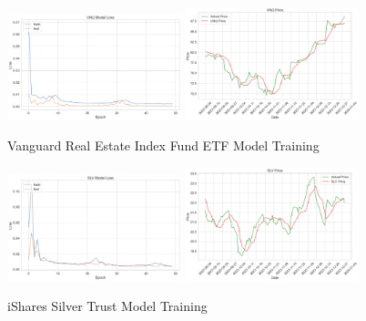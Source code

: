 \documentclass{ledger}
\begin{document}
\begin{figure}[htbp]
    \centering
    \includegraphics[width=0.45\textwidth]{code/price-prediction/lstm/images/vnq_loss.png} %
    \hspace{0.05\textwidth} %
    \includegraphics[width=0.45\textwidth]{code/price-prediction/lstm/images/vnq_price.png} %
    \caption{Vanguard Real Estate Index Fund ETF Model Training}
    \label{fig:side_by_side}
\end{figure}

\begin{figure}[htbp]
    \centering
    \includegraphics[width=0.45\textwidth]{code/price-prediction/lstm/images/slv_loss.png} %
    \hspace{0.05\textwidth} %
    \includegraphics[width=0.45\textwidth]{code/price-prediction/lstm/images/slv_price.png} %
    \caption{iShares Silver Trust Model Training}
    \label{fig:side_by_side}
\end{figure}
\end{document}
